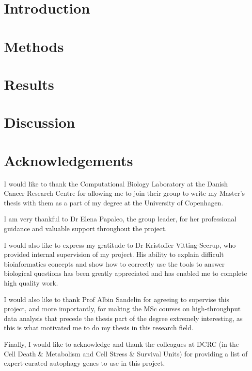 \documentclass[10pt, openright,oneside]{book}
\begin{document}
\chapter{Introduction}


\chapter{Methods}


\chapter{Results}


\chapter{Discussion}




\cleardoublepage
{}
\chapter*{Acknowledgements}

I would like to thank the Computational Biology Laboratory at the Danish Cancer Research Centre for allowing me to join their group to write my Master’s thesis with them as a part of my degree at the University of Copenhagen.  

I am very thankful to Dr Elena Papaleo, the group leader, for her professional guidance and valuable support throughout the project. 

I would also like to express my gratitude to Dr Kristoffer Vitting-Seerup, who provided internal supervision of my project. His ability to explain difficult bioinformatics concepts and show how to correctly use the tools to answer biological questions has been greatly appreciated and has enabled me to complete high quality work.

I would also like to thank Prof Albin Sandelin for agreeing to supervise this project, and more importantly, for making the MSc courses on high-throughput data analysis that precede the thesis part of the degree extremely interesting,  as this is what motivated me to do my thesis in this research field. 

Finally, I would like to acknowledge and thank the colleagues at DCRC (in the Cell Death & Metabolism and Cell Stress & Survival Units)  for providing a list of expert-curated autophagy genes to use in this project.
\end{document}
